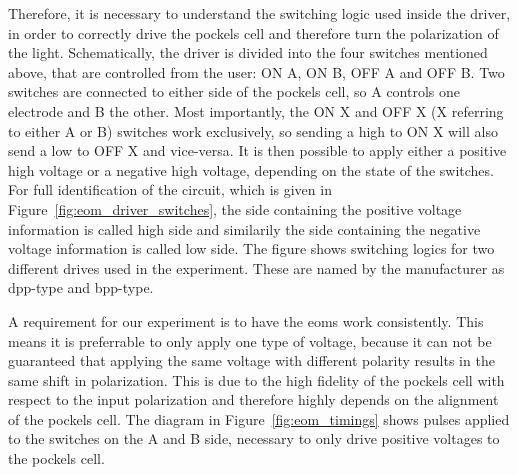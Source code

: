 Therefore, it is necessary to understand the switching logic used inside the driver, in order to correctly drive the pockels cell and therefore turn the polarization of the light. Schematically, the driver is divided into the four switches mentioned above, that are controlled from the user: ON A, ON B, OFF A and OFF B. Two switches are connected to either side of the pockels cell, so A controls one electrode and B the other. Most importantly, the ON X and OFF X (X referring to either A or B) switches work exclusively, so sending a high to ON X will also send a low to OFF X and vice-versa. It is then possible to apply either a positive high voltage or a negative high voltage, depending on the state of the switches. For full identification of the circuit, which is given in Figure~\ref{fig:eom_driver_switches}, the side containing the positive voltage information is called high side and similarily the side containing the negative voltage information is called low side. The figure shows switching logics for two different drives used in the experiment. These are named by the manufacturer as dpp-type and bpp-type.

\begin{figure}[t]%
\end{figure}

A requirement for our experiment is to have the \acp{eom} work consistently. This means it is preferrable to only apply one type of voltage, because it can not be guaranteed that applying the same voltage with different polarity results in the same shift in polarization. This is due to the high fidelity of the pockels cell with respect to the input polarization and therefore highly depends on the alignment of the pockels cell. The diagram in Figure~\ref{fig:eom_timings} shows pulses applied to the switches on the A and B side, necessary to only drive positive voltages to the pockels cell.

